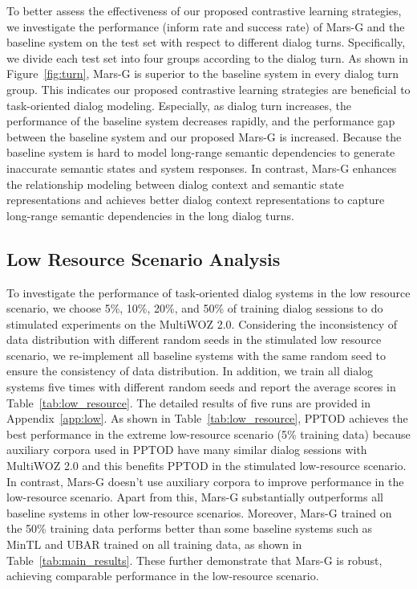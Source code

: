 To better assess the effectiveness of  our proposed  contrastive learning strategies, we investigate the performance (inform rate and success rate) of Mars-G and the baseline system on the test set with respect to different dialog turns.  Specifically, we divide
each test set into four groups according to the dialog turn. As shown in Figure~\ref{fig:turn}, Mars-G is superior to the baseline system in every dialog turn group. This indicates our proposed contrastive learning strategies are  beneficial to task-oriented dialog modeling. Especially, as dialog turn increases, the performance of the baseline system
decreases rapidly, and the performance gap between the baseline system and our proposed Mars-G is increased. Because the baseline system  is hard to model long-range semantic dependencies to generate inaccurate semantic states and system responses. In contrast,  Mars-G enhances the relationship modeling between dialog context and  semantic state representations  and achieves better dialog context representations to capture long-range semantic dependencies in the long dialog turns.

\subsection{Low Resource Scenario Analysis}

To investigate the performance of task-oriented dialog systems in the  low resource scenario, we choose 5\%, 10\%, 20\%, and 50\% of training dialog sessions   to do stimulated experiments on the MultiWOZ 2.0. 
Considering the inconsistency of data distribution with different random seeds in the  stimulated low resource scenario, we  re-implement all baseline systems with the same random seed to ensure the consistency of data distribution.
In addition, we train all dialog systems five times with different random seeds and report the average scores in Table~\ref{tab:low_resource}. The detailed results of five runs are provided in Appendix~\ref{app:low}.
As shown in Table~\ref{tab:low_resource},  PPTOD achieves the best performance in the extreme low-resource  scenario (5\% training data) because  auxiliary corpora  used in PPTOD have many similar dialog sessions with MultiWOZ 2.0 and this benefits PPTOD in the stimulated low-resource  scenario. In contrast, Mars-G doesn’t use auxiliary corpora to improve performance in the low-resource  scenario.
Apart from this,  Mars-G substantially outperforms all baseline systems  in other low-resource scenarios.
Moreover, Mars-G trained on the 50\% training data performs better than some baseline systems such as MinTL and UBAR trained on all training data, as shown in Table~\ref{tab:main_results}. These further demonstrate that Mars-G is robust, achieving comparable performance in the low-resource scenario.

